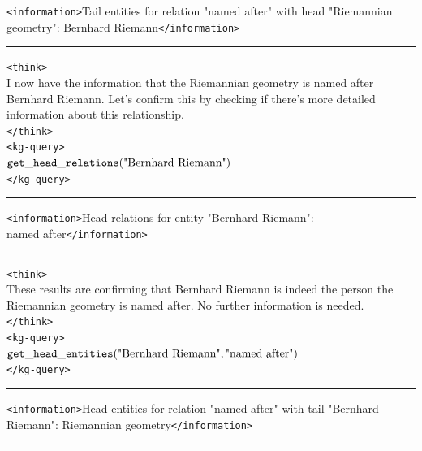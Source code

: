 \begin{table}[H]
\begin{reasonbox}[title=\framework{} Response Example - \dataset{QALD10en}]
\texttt{<information>}Tail entities for relation "named after" with head "Riemannian geometry": Bernhard Riemann\texttt{</information>}

\vspace{0.5em}\hrule\vspace{0.5em}

\begin{blueblock}
\texttt{<think>} \\
I now have the information that the Riemannian geometry is named after Bernhard Riemann. Let's confirm this by checking if there's more detailed information about this relationship. \\
\texttt{</think>} \\
\texttt{<kg-query>} \\
$\mathtt{get\_head\_relations}(\text{"Bernhard Riemann"})$ \\
\texttt{</kg-query>}
\end{blueblock}

\vspace{0.5em}\hrule\vspace{0.5em}

\texttt{<information>}Head relations for entity "Bernhard Riemann": \\
named after\texttt{</information>}

\vspace{0.5em}\hrule\vspace{0.5em}

\begin{blueblock}
\texttt{<think>} \\
These results are confirming that Bernhard Riemann is indeed the person the Riemannian geometry is named after. No further information is needed. \\
\texttt{</think>} \\
\texttt{<kg-query>} \\
$\mathtt{get\_head\_entities}(\text{"Bernhard Riemann"}, \text{"named after"})$ \\
\texttt{</kg-query>}
\end{blueblock}

\vspace{0.5em}\hrule\vspace{0.5em}

\texttt{<information>}Head entities for relation "named after" with tail "Bernhard Riemann": Riemannian geometry\texttt{</information>}

\vspace{0.5em}\hrule\vspace{0.5em}


\end{reasonbox}
\end{table}
